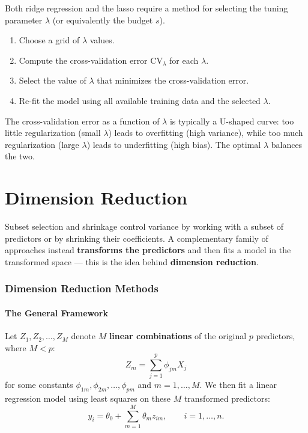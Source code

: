 \documentclass[11pt,a4paper]{article}
\theoremstyle{definition}
\theoremstyle{plain}
\theoremstyle{remark}
\begin{document}
Both ridge regression and the lasso require a method for selecting the tuning parameter $\lambda$ (or equivalently the budget $s$).

\begin{tcolorbox}[colback=blue!5!white,colframe=blue!75!black,title=\textbf{Tuning Parameter Selection via Cross-Validation}]
\begin{enumerate}
    \item Choose a grid of $\lambda$ values.
    \item Compute the cross-validation error $\mathrm{CV}_\lambda$ for each $\lambda$.
    \item Select the value of $\lambda$ that minimizes the cross-validation error.
    \item Re-fit the model using all available training data and the selected $\lambda$.
\end{enumerate}
\end{tcolorbox}

The cross-validation error as a function of $\lambda$ is typically a U-shaped curve: too little regularization (small $\lambda$) leads to overfitting (high variance), while too much regularization (large $\lambda$) leads to underfitting (high bias). The optimal $\lambda$ balances the two.


\part{Dimension Reduction}

Subset selection and shrinkage control variance by working with a subset of predictors or by shrinking their coefficients. A complementary family of approaches instead \textbf{transforms the predictors} and then fits a model in the transformed space — this is the idea behind \textbf{dimension reduction}.

\section{Dimension Reduction Methods}

\subsection{The General Framework}

Let $Z_1, Z_2, \ldots, Z_M$ denote $M$ \textbf{linear combinations} of the original $p$ predictors, where $M < p$:
\[
    Z_m = \sum_{j=1}^{p} \phi_{jm} X_j
\]
for some constants $\phi_{1m}, \phi_{2m}, \ldots, \phi_{pm}$ and $m = 1, \ldots, M$. We then fit a linear regression model using least squares on these $M$ transformed predictors:
\[
    y_i = \theta_0 + \sum_{m=1}^{M} \theta_m z_{im}, \qquad i = 1, \ldots, n.
\]
\end{document}
